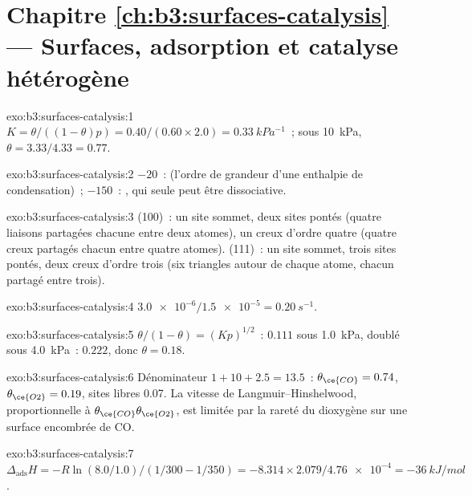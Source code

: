 \section*{Chapitre \ref{ch:b3:surfaces-catalysis} --- Surfaces, adsorption et catalyse hétérogène}

\begin{solution}{exo:b3:surfaces-catalysis:1}
$K = \theta/((1 - \theta)p) = 0.40/(0.60 \times 2.0) = \qty{0.33}{kPa^{-1}}$~; sous \qty{10}{kPa}, $\theta = 3.33/4.33 = 0.77$.
\end{solution}

\begin{solution}{exo:b3:surfaces-catalysis:2}
$-20$~:  (l'ordre de grandeur d'une enthalpie de
condensation)~; $-150$~: , qui seule peut être
dissociative.
\end{solution}

\begin{solution}{exo:b3:surfaces-catalysis:3}
(100)~: un site sommet, deux sites pontés (quatre liaisons partagées
chacune entre deux atomes), un creux d'ordre quatre (quatre creux
partagés chacun entre quatre atomes). (111)~: un site sommet, trois
sites pontés, deux creux d'ordre trois (six triangles autour de chaque
atome, chacun partagé entre trois).
\end{solution}

\begin{solution}{exo:b3:surfaces-catalysis:4}
$\num{3.0e-6}/\num{1.5e-5} = \qty{0.20}{s^{-1}}$.
\end{solution}

\begin{solution}{exo:b3:surfaces-catalysis:5}
$\theta/(1 - \theta) = (Kp)^{1/2}$~: $0.111$ sous \qty{1.0}{kPa}, doublé sous \qty{4.0}{kPa}~: $0.222$, donc $\theta = 0.18$.
\end{solution}

\begin{solution}{exo:b3:surfaces-catalysis:6}
Dénominateur $1 + 10 + 2.5 = 13.5$~: $\theta_{\ce{CO}} = 0.74$,
$\theta_{\ce{O2}} = 0.19$, sites libres 0.07. La vitesse de
Langmuir--Hinshelwood, proportionnelle à $\theta_{\ce{CO}}\theta_{\ce{O2}}$,
est limitée par la rareté du dioxygène sur une surface encombrée de CO.
\end{solution}

\begin{solution}{exo:b3:surfaces-catalysis:7}
$\Delta_{\mathrm{ads}}H = -R\ln(8.0/1.0)/(1/300 - 1/350) = -8.314 \times 2.079/\num{4.76e-4} = \qty{-36}{kJ/mol}$.
\end{solution}

